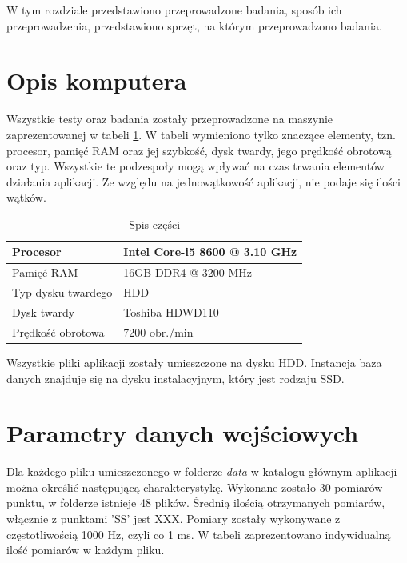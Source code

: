 W tym rozdziale przedstawiono przeprowadzone badania, sposób ich przeprowadzenia, przedstawiono sprzęt, na którym przeprowadzono badania.
\section{Opis komputera}
Wszystkie testy oraz badania zostały przeprowadzone na maszynie zaprezentowanej w tabeli \ref{tab:machine}. W tabeli wymieniono tylko znaczące elementy, tzn. procesor, pamięć RAM oraz jej szybkość, dysk twardy, jego prędkość obrotową oraz typ. Wszystkie te podzespoły mogą wpływać na czas trwania elementów działania aplikacji. Ze względu na jednowątkowość aplikacji, nie podaje się ilości wątków.
\begin{table}[H]
    \centering
    \begin{tabular}{|l|l|}
        \hline
        Procesor       & Intel Core-i5 8600 @ 3.10 GHz          \\ \hline
        Pamięć RAM     & 16GB DDR4 @ 3200 MHz \\ \hline
        Typ dysku twardego           & HDD              \\ \hline
        Dysk twardy         & Toshiba HDWD110              \\ \hline
        Prędkość obrotowa         & 7200 obr./min              \\ \hline
    \end{tabular}
    \caption{Spis części}
    \label{tab:machine}
\end{table}
Wszystkie pliki aplikacji zostały umieszczone na dysku HDD. Instancja baza danych znajduje się na dysku instalacyjnym, który jest rodzaju SSD.
\section{Parametry danych wejściowych}
\label{sec:entryparameters}
Dla każdego pliku umieszczonego w folderze \emph{\/data} w katalogu głównym aplikacji można określić następującą charakterystykę. Wykonane zostało 30 pomiarów punktu, w folderze istnieje 48 plików. Średnią ilością otrzymanych pomiarów, włącznie z punktami 'SS' jest XXX. Pomiary zostały wykonywane z częstotliwością 1000 Hz, czyli co 1 ms. W tabeli zaprezentowano indywidualną ilość pomiarów w każdym pliku.
